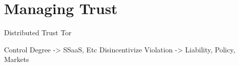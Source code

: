 \section{Managing Trust}
\label{sec:mitigation}

Distributed Trust
Tor

Control Degree -> SSaaS, Etc
Disincentivize Violation -> Liability, Policy, Markets
